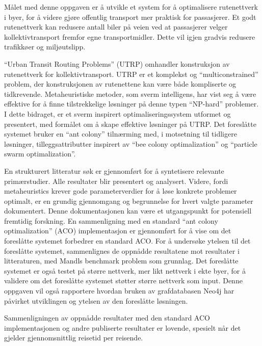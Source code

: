 Målet med denne oppgaven er å utvikle et system for å optimalisere rutenettverk i byer, for å videre gjøre offentlig transport mer praktisk for passasjerer. Et godt rutenettverk kan redusere antall biler på veien ved at passasjerer velger kollektivtransport fremfor egne transportmidler. Dette vil igjen gradvis redusere trafikkøer og miljøutslipp.

``Urban Transit Routing Problems'' (UTRP) omhandler konstruksjon av rutenettverk for kollektivtransport. UTRP er et komplekst og ``multiconstrained'' problem, der konstruksjonen av rutenettene kan være både kompliserte og tidkrevende. Metaheuristiske metoder, som sverm intelligens, har vist seg å være effektive for å finne tilstrekkelige løsninger på denne typen ``NP-hard'' problemer. I dette bidraget, er et sverm inspirert optimaliseringssystem utformet og presentert, med formålet om å skape effektive løsninger på UTRP. Det foreslåtte systemet bruker en ``ant colony'' tilnærming med, i motsetning til tidligere løsninger, tilleggsattributter inspirert av ``bee colony optimalization'' og ``particle swarm optimalization''.

En strukturert litteratur søk er gjennomført for å syntetisere relevante primærstudier. Alle resultater blir presentert og analysert. Videre, fordi metaheuristics krever gode parameterverdier for å løse konkrete problemer optimalt, er en grundig gjennomgang og begrunnelse for hvert valgte parameter dokumentert. Denne dokumentasjonen kan være et utgangspunkt for potensiell fremtidig forskning. En sammenligning med en standard ``ant colony optimalization'' (ACO) implementasjon er gjennomført for å vise om det foreslåtte systemet forbedrer en standard ACO. For å undersøke ytelsen til det foreslåtte systemet, sammenlignes de oppnådde resultatene mot resultater i litteraturen, med Mandls benchmark problem som grunnlag. Det foreslåtte systemet er også testet på større nettverk, mer likt nettverk i ekte byer, for å validere om det foreslåtte systemet støtter større nettverk som input. Denne oppgaven vil også rapportere hvordan bruken av grafdatabasen Neo4j har påvirket utviklingen og ytelsen av den foreslåtte løsningen.

Sammenligningen av oppnådde resultater med den standard ACO implementasjonen og andre publiserte resultater er lovende, spesielt når det gjelder gjennomsnittlig reisetid per reisende.
